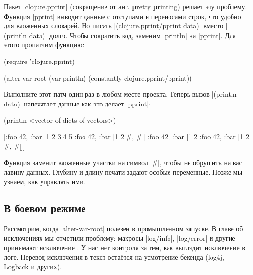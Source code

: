 
Пакет \spverb|clojure.pprint| (сокращение от анг. \textbf{p}retty \textbf{p}rinting)
решает эту проблему. Функция \spverb|pprint| выводит данные с отступами и переносами строк,
что удобно для вложенных словарей. Но писать \spverb|(clojure.pprint/pprint data)|
вместо \spverb|(println data)| долго. Чтобы сократить код, заменим \spverb|println|
на \spverb|pprint|. Для этого пропатчим функцию:

\begin{english}
  \begin{clojure}
(require 'clojure.pprint)

(alter-var-root
 (var println)
 (constantly clojure.pprint/pprint))
  \end{clojure}
\end{english}

Выполните этот патч один раз в любом месте проекта. Теперь вызов
\spverb|(println data)| напечатает данные как это делает \spverb|pprint|:

\begin{english}
  \begin{clojure}
(println <vector-of-dicts-of-vectors>)

[{:foo 42, :bar [1 2 3 4 5 {:foo 42, :bar [1 2 {#, #}]}]}
 {:foo 42, :bar [1 2 {:foo 42, :bar [1 2 {#, #}]}]}]
  \end{clojure}
\end{english}

Функция заменит вложенные участки на символ \spverb|#|, чтобы не обрушить на
вас лавину данных. Глубину и длину печати задают особые переменные. Позже мы
узнаем, как управлять ими.

\subsection{В боевом режиме}

\label{install-logger}


Рассмотрим, когда \spverb|alter-var-root| полезен в промышленном запуске. В
главе об исключениях мы отметили проблему: макросы \spverb|log/info|,
\spverb|log/error| и другие принимают исключение . У нас нет
контроля за тем, как выглядит исключение в логе. Перевод исключения в текст
оста\"{е}тся на усмотрение бекенда (log4j, Logback и других).

